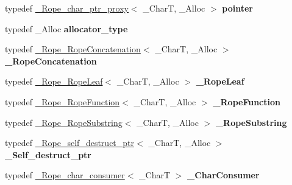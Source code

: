 \begin{DoxyCompactItemize}
\item 
\mbox{\label{classrope_ab47f343d984dadc603f6ecf01e43f581}} 
typedef \hyperlink{class___rope__char__ptr__proxy}{\+\_\+\+Rope\+\_\+char\+\_\+ptr\+\_\+proxy}$<$ \+\_\+\+CharT, \+\_\+\+Alloc $>$ {\bfseries pointer}
\item 
\mbox{\label{classrope_ab74101063816e95510071831ede2f993}} 
typedef \+\_\+\+Alloc {\bfseries allocator\+\_\+type}
\item 
\mbox{\label{classrope_ab96a64c7359d79fff697387dad327a9c}} 
typedef \hyperlink{struct___rope___rope_concatenation}{\+\_\+\+Rope\+\_\+\+Rope\+Concatenation}$<$ \+\_\+\+CharT, \+\_\+\+Alloc $>$ {\bfseries \+\_\+\+Rope\+Concatenation}
\item 
\mbox{\label{classrope_ac495dc7e6c31d44fc98dd41f646b0fb1}} 
typedef \hyperlink{struct___rope___rope_leaf}{\+\_\+\+Rope\+\_\+\+Rope\+Leaf}$<$ \+\_\+\+CharT, \+\_\+\+Alloc $>$ {\bfseries \+\_\+\+Rope\+Leaf}
\item 
\mbox{\label{classrope_a984d963ed5e70a487f66ea4d32098dcc}} 
typedef \hyperlink{struct___rope___rope_function}{\+\_\+\+Rope\+\_\+\+Rope\+Function}$<$ \+\_\+\+CharT, \+\_\+\+Alloc $>$ {\bfseries \+\_\+\+Rope\+Function}
\item 
\mbox{\label{classrope_acbda6b8ea841e36fefca7a1ecaa21516}} 
typedef \hyperlink{struct___rope___rope_substring}{\+\_\+\+Rope\+\_\+\+Rope\+Substring}$<$ \+\_\+\+CharT, \+\_\+\+Alloc $>$ {\bfseries \+\_\+\+Rope\+Substring}
\item 
\mbox{\label{classrope_a49820af7ad33f23a6eb363d041ee1a94}} 
typedef \hyperlink{struct___rope__self__destruct__ptr}{\+\_\+\+Rope\+\_\+self\+\_\+destruct\+\_\+ptr}$<$ \+\_\+\+CharT, \+\_\+\+Alloc $>$ {\bfseries \+\_\+\+Self\+\_\+destruct\+\_\+ptr}
\item 
\mbox{\label{classrope_af8c98ba9d81593e88751ab1787e959b1}} 
typedef \hyperlink{class___rope__char__consumer}{\+\_\+\+Rope\+\_\+char\+\_\+consumer}$<$ \+\_\+\+CharT $>$ {\bfseries \+\_\+\+Char\+Consumer}
\end{DoxyCompactItemize}
